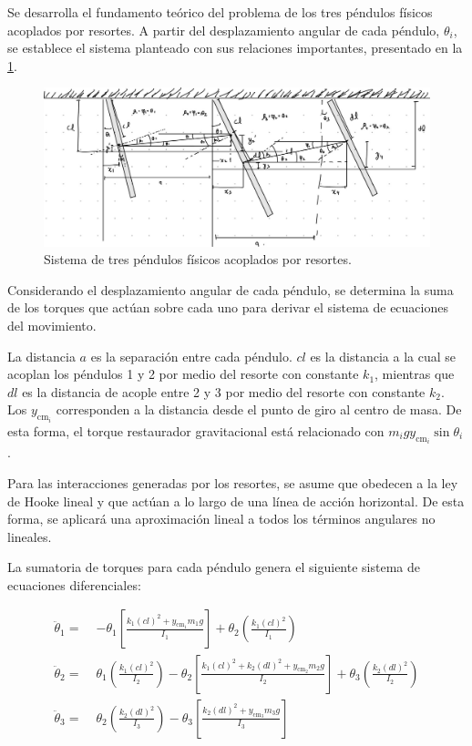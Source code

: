 Se desarrolla el fundamento teórico del problema de los tres péndulos
físicos acoplados por resortes. A partir del desplazamiento angular
de cada péndulo, \(\theta_i\), se establece el sistema planteado con
sus relaciones importantes, presentado en la \cref{fig:sistema-pendulos}.

\begin{figure}[htbp!]
  \centering
  \includegraphics[width=0.8\linewidth]{Figures/IM1.jpeg}
  \caption{Sistema de tres péndulos físicos acoplados por resortes.}
  \label{fig:sistema-pendulos}
\end{figure}

Considerando el desplazamiento angular de cada péndulo, se determina
la suma de los torques que actúan sobre cada uno para derivar el
sistema de ecuaciones del movimiento.

La distancia \( a \) es la separación entre cada péndulo. \( cl \) es
la distancia a la cual se acoplan los péndulos 1 y 2 por medio del
resorte con constante \( k_1 \), mientras que \( dl \) es la distancia
de acople entre 2 y 3 por medio del resorte con constante \( k_2 \).
Los \(y_{\text{cm}_i}\) corresponden a la distancia desde el punto de
giro al centro de masa. De esta forma, el torque restaurador
gravitacional está relacionado con \(m_i g y_{\text{cm}_i} \sin{\theta_i}\).

Para las interacciones generadas por los resortes, se asume que
obedecen a la ley de Hooke lineal y que actúan a lo largo de una
línea de acción horizontal. De esta forma, se aplicará una
aproximación lineal a todos los términos angulares no lineales.

La sumatoria de torques para cada péndulo genera el siguiente
sistema de ecuaciones diferenciales:

\begin{equation}
  \begin{aligned}
    \ddot{\theta}_1 =\; &
    -\theta_1 \left[ \frac{k_1 (cl)^2 + y_{\text{cm}_1} m_1 g}{I_1} \right]
    + \theta_2 \left( \frac{k_1 (cl)^2}{I_1} \right) \\[0.5em]
    \ddot{\theta}_2 =\; &
    \theta_1 \left( \frac{k_1 (cl)^2}{I_2} \right)
    - \theta_2 \left[ \frac{k_1 (cl)^2 + k_2 (dl)^2 + y_{\text{cm}_2} m_2 g}{I_2} \right]
    + \theta_3 \left( \frac{k_2 (dl)^2}{I_2} \right) \\[0.5em]
    \ddot{\theta}_3 =\; &
    \theta_2 \left( \frac{k_2 (dl)^2}{I_3} \right)
    - \theta_3 \left[ \frac{k_2 (dl)^2 + y_{\text{cm}_3} m_3 g}{I_3} \right]
  \end{aligned}
\end{equation}

